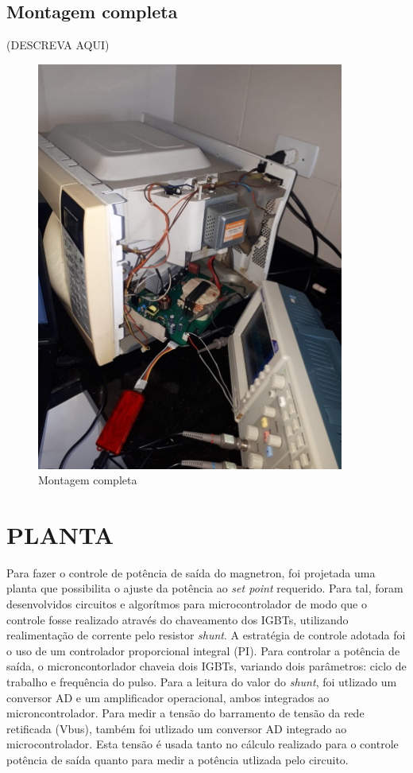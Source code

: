 \subsection{Montagem completa}
(DESCREVA AQUI)
\begin{figure}[H]
    \centering
    \includegraphics[width=0.9\textwidth]{./dados/figuras/montagem-full}
    \caption{Montagem completa}
    \label{fig:figura-montagem-shunt-uc}
\end{figure}

\section{PLANTA}
Para fazer o controle de potência de saída do magnetron, foi projetada uma planta que possibilita o ajuste da potência ao \textit{set point} requerido. Para tal, foram desenvolvidos circuitos e algorítmos para microcontrolador de modo que o controle fosse realizado através do chaveamento dos IGBTs, utilizando realimentação de corrente pelo resistor \textit{shunt}. A estratégia de controle adotada foi o uso de um controlador proporcional integral (PI). Para controlar a potência de saída, o microncontorlador chaveia dois IGBTs, variando dois parâmetros: ciclo de trabalho e frequência do pulso. Para a leitura do valor do \textit{shunt}, foi utlizado um conversor AD e um amplificador operacional, ambos integrados ao microncontrolador. Para medir a tensão do barramento de tensão da rede retificada (Vbus), também foi utlizado um conversor AD integrado ao microcontrolador. Esta tensão é usada tanto no cálculo realizado para o controle potência de saída quanto para medir a potência utlizada pelo circuito.



